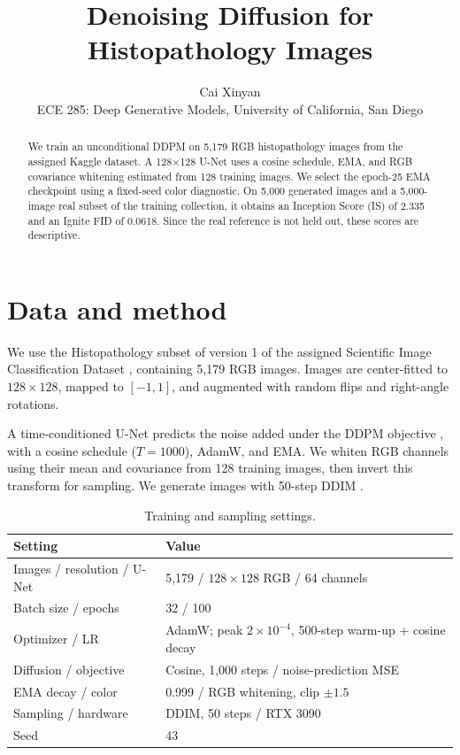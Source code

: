 \documentclass{article}
\title{Denoising Diffusion for Histopathology Images}
\author{Cai Xinyan\\ECE 285: Deep Generative Models, University of California, San Diego}
\date{}
\begin{document}
\maketitle

\begin{abstract}
We train an unconditional DDPM on 5,179 RGB histopathology images from the assigned Kaggle dataset. A 128$\times$128 U-Net uses a cosine schedule, EMA, and RGB covariance whitening estimated from 128 training images. We select the epoch-25 EMA checkpoint using a fixed-seed color diagnostic. On 5,000 generated images and a 5,000-image real subset of the training collection, it obtains an Inception Score (IS) of 2.335 and an Ignite FID of 0.0618. Since the real reference is not held out, these scores are descriptive.
\end{abstract}

\section{Data and method}
We use the Histopathology subset of version 1 of the assigned Scientific Image Classification Dataset \citep{datafinal}, containing 5,179 RGB images. Images are center-fitted to $128\times128$, mapped to $[-1,1]$, and augmented with random flips and right-angle rotations.

A time-conditioned U-Net predicts the noise added under the DDPM objective \citep{ho2020ddpm}, with a cosine schedule ($T=1000$), AdamW, and EMA. We whiten RGB channels using their mean and covariance from 128 training images, then invert this transform for sampling. We generate images with 50-step DDIM \citep{song2021ddim}.

\begin{table}[H]
\centering
\small
\caption{Training and sampling settings.}
\label{tab:settings}
\begin{tabular}{ll}
\toprule
Setting & Value \\
\midrule
Images / resolution / U-Net & 5,179 / $128\times128$ RGB / 64 channels \\
Batch size / epochs & 32 / 100 \\
Optimizer / LR & AdamW; peak $2\times10^{-4}$, 500-step warm-up + cosine decay \\
Diffusion / objective & Cosine, 1,000 steps / noise-prediction MSE \\
EMA decay / color & 0.999 / RGB whitening, clip $\pm1.5$ \\
Sampling / hardware & DDIM, 50 steps / RTX 3090 \\
Seed & 43 \\
\bottomrule
\end{tabular}
\end{table}
\end{document}
